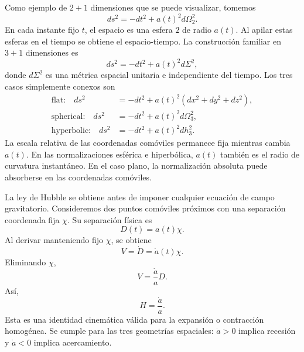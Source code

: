 Como ejemplo de \(2+1\) dimensiones que se puede visualizar, tomemos
\begin{equation}
ds^2 = -dt^2 + a(t)^2 d\Omega_2^2.
\label{eq:c03-two-plus-one}
\end{equation}
En cada instante fijo \(t\), el espacio es una esfera \(2\) de radio \(a(t)\). Al apilar estas esferas en el tiempo se obtiene el espacio-tiempo. La construcción familiar en \(3+1\) dimensiones es
\begin{equation}
ds^2 = -dt^2 + a(t)^2 d\Sigma^2,
\label{eq:c03-frw-general}
\end{equation}
donde \(d\Sigma^2\) es una métrica espacial unitaria e independiente del tiempo. Los tres casos simplemente conexos son
\begin{align}
\text{flat:}\quad
ds^2&=-dt^2+a(t)^2\left(dx^2+dy^2+dz^2\right),\label{eq:c03-frw-flat}\\
\text{spherical:}\quad
ds^2&=-dt^2+a(t)^2d\Omega_3^2,\label{eq:c03-frw-spherical}\\
\text{hyperbolic:}\quad
ds^2&=-dt^2+a(t)^2dh_3^2.\label{eq:c03-frw-hyperbolic}
\end{align}
La escala relativa de las coordenadas comóviles permanece fija mientras cambia \(a(t)\). En las normalizaciones esférica e hiperbólica, \(a(t)\) también es el radio de curvatura instantáneo. En el caso plano, la normalización absoluta puede absorberse en las coordenadas comóviles.

La ley de Hubble se obtiene antes de imponer cualquier ecuación de campo gravitatorio. Consideremos dos puntos comóviles próximos con una separación coordenada fija \(\chi\). Su separación física es
\begin{equation}
D(t)=a(t)\chi.
\label{eq:c03-comoving-distance}
\end{equation}
Al derivar manteniendo fijo \(\chi\), se obtiene
\begin{equation}
V=\dot D=\dot a(t)\chi.
\end{equation}
Eliminando \(\chi\),
\begin{equation}
V = \frac{\dot a}{a} D.
\label{eq:c03-hubble-law}
\end{equation}
Así,
\begin{equation}
H = \frac{\dot a}{a}.
\label{eq:c03-hubble-parameter}
\end{equation}
Esta es una identidad cinemática válida para la expansión o contracción homogénea. Se cumple para las tres geometrías espaciales: \(\dot a>0\) implica recesión y \(\dot a<0\) implica acercamiento.

